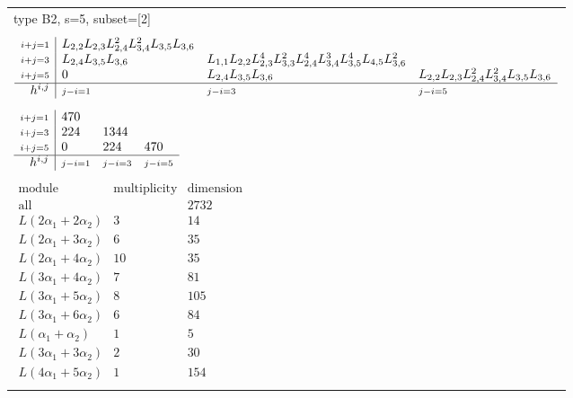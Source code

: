 \documentclass[crop,border=2mm]{standalone}
\begin{document}
\begin{tabular}{l}
{\huge type B2, s=5, subset=[2]}\\ \\


$\displaystyle
\begin{array}{r|l l l}
	{\scriptstyle i+j=1}&L_{2,2}L_{2,3}L_{2,4}^{2}L_{3,4}^{2}L_{3,5}L_{3,6}&&\\
	{\scriptstyle i+j=3}&L_{2,4}L_{3,5}L_{3,6}&L_{1,1}L_{2,2}L_{2,3}^{4}L_{3,3}^{2}L_{2,4}^{4}L_{3,4}^{3}L_{3,5}^{4}L_{4,5}L_{3,6}^{2}&\\
	{\scriptstyle i+j=5}&0&L_{2,4}L_{3,5}L_{3,6}&L_{2,2}L_{2,3}L_{2,4}^{2}L_{3,4}^{2}L_{3,5}L_{3,6}\\
	\hline h^{i,j}&{\scriptstyle j-i=1}&{\scriptstyle j-i=3}&{\scriptstyle j-i=5}
\end{array}
$ \\ \\


$\displaystyle
\begin{array}{r|l l l}
	{\scriptstyle i+j=1}&470&&\\
	{\scriptstyle i+j=3}&224&1344&\\
	{\scriptstyle i+j=5}&0&224&470\\
	\hline h^{i,j}&{\scriptstyle j-i=1}&{\scriptstyle j-i=3}&{\scriptstyle j-i=5}
\end{array}
$ \\ \\


$\displaystyle
\begin{array}{rll}
	\text{module}&\text{multiplicity}&\text{dimension} \\ \hline \text{all}&&2732 \\
	L\left( 2\alpha_{1}+ 2\alpha_{2}\right)&3&14\\
	L\left( 2\alpha_{1}+ 3\alpha_{2}\right)&6&35\\
	L\left( 2\alpha_{1}+ 4\alpha_{2}\right)&10&35\\
	L\left( 3\alpha_{1}+ 4\alpha_{2}\right)&7&81\\
	L\left( 3\alpha_{1}+ 5\alpha_{2}\right)&8&105\\
	L\left( 3\alpha_{1}+ 6\alpha_{2}\right)&6&84\\
	L\left(\alpha_{1}+\alpha_{2}\right)&1&5\\
	L\left( 3\alpha_{1}+ 3\alpha_{2}\right)&2&30\\
	L\left( 4\alpha_{1}+ 5\alpha_{2}\right)&1&154
\end{array}
$ \\ \\

\end{tabular}
\end{document}
